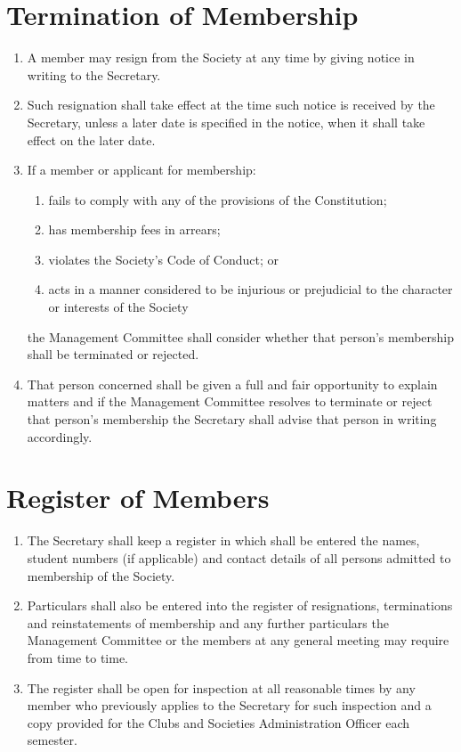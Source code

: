 \documentclass[a4paper]{article}
\begin{document}
\section{Termination of Membership}
\begin{enumerate}
\item A member may resign from the Society at any time by giving notice in writing to the Secretary.
\item Such resignation shall take effect at the time such notice is received by the Secretary, unless a later date is specified in the notice, when it shall take effect on the later date.
\item If a member or applicant for membership:
	\begin{enumerate}
	\item fails to comply with any of the provisions of the Constitution;
	\item has membership fees in arrears;
	\item violates the Society's Code of Conduct; or
	\item acts in a manner considered to be injurious or prejudicial to the character or interests of the Society
	\end{enumerate}
the Management Committee shall consider whether that person's membership shall be terminated or rejected.
\item That person concerned shall be given a full and fair opportunity to explain matters and if the Management Committee resolves to terminate or reject that person's membership the Secretary shall advise that person in writing accordingly.
\end{enumerate}

\section{Register of Members}
\begin{enumerate}
\item The Secretary shall keep a register in which shall be entered the names, student numbers (if applicable) and contact details of all persons admitted to membership of the Society.
\item Particulars shall also be entered into the register of resignations, terminations and reinstatements of membership and any further particulars the Management Committee or the members at any general meeting may require from time to time.
\item The register shall be open for inspection at all reasonable times by any member who previously applies to the Secretary for such inspection and a copy provided for the Clubs and Societies Administration Officer each semester.
\end{enumerate}
\end{document}
